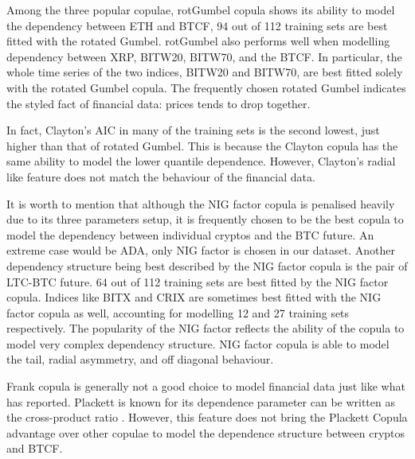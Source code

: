 Among the three popular copulae, rotGumbel copula shows its ability to model the dependency between ETH and BTCF,
94 out of 112 training sets are best fitted with the rotated Gumbel.
rotGumbel also performs well when modelling dependency between XRP, BITW20, BITW70, and the BTCF.
In particular, the whole time series of the two indices, BITW20 and BITW70, are best fitted solely with the rotated Gumbel copula.
The frequently chosen rotated Gumbel indicates the styled fact of financial data: prices tends to drop together.  \medskip




In fact, Clayton's AIC in many of the training sets is the second lowest, just higher than that of rotated Gumbel.
This is because the Clayton copula has the same ability to model the lower quantile dependence.
However, Clayton's radial like feature does not match the behaviour of the financial data. \medskip

It is worth to mention that although the NIG factor copula is penalised heavily due to its three parameters setup, it is frequently chosen to be the best copula to model the dependency between individual cryptos and the BTC future.
An extreme case would be ADA, only NIG factor is chosen in our dataset.
Another dependency structure being best described by the NIG factor copula is the pair of LTC-BTC future.
64 out of 112 training sets are best fitted by the NIG factor copula.
Indices like BITX and CRIX are sometimes best fitted with the NIG factor copula as well, accounting for modelling 12 and 27 training sets respectively.
The popularity of the NIG factor reflects the ability of the copula to model very complex dependency structure.
NIG factor copula is able to model the tail, radial asymmetry, and off diagonal behaviour.  \medskip %

Frank copula is generally not a good choice to model financial data just like what \cite{barbi2014copula} has reported.
Plackett is known for its dependence parameter can be written as the cross-product ratio \citep{joe1997multivariate}.
However, this feature does not bring the Plackett Copula advantage over other copulae to model the dependence structure between cryptos and BTCF. \medskip

